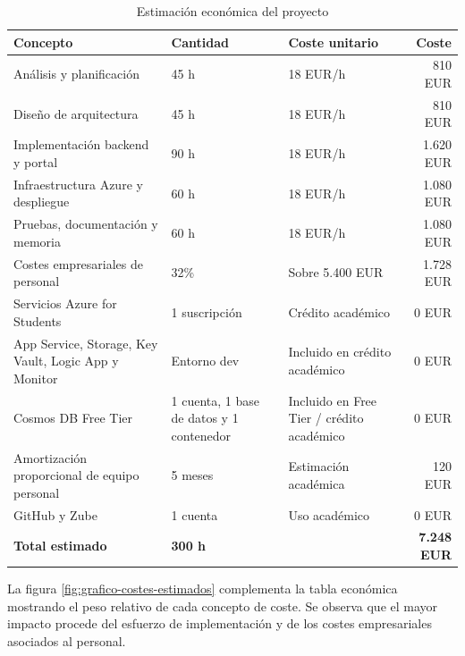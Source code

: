 \begin{table}[ht]
\centering
\scriptsize
\begin{tabular}{p{} p{} p{} r}
\textbf{Concepto} & \textbf{Cantidad} & \textbf{Coste unitario} & \textbf{Coste} \\
\hline
Análisis y planificación & 45 h & 18 EUR/h & 810 EUR \\
Diseño de arquitectura & 45 h & 18 EUR/h & 810 EUR \\
Implementación backend y portal & 90 h & 18 EUR/h & 1.620 EUR \\
Infraestructura Azure y despliegue & 60 h & 18 EUR/h & 1.080 EUR \\
Pruebas, documentación y memoria & 60 h & 18 EUR/h & 1.080 EUR \\
Costes empresariales de personal & 32\% & Sobre 5.400 EUR & 1.728 EUR \\
Servicios Azure for Students & 1 suscripción & Crédito académico & 0 EUR \\
App Service, Storage, Key Vault, Logic App y Monitor & Entorno dev & Incluido en crédito académico & 0 EUR \\
Cosmos DB Free Tier & 1 cuenta, 1 base de datos y 1 contenedor & Incluido en Free Tier / crédito académico & 0 EUR \\
Amortización proporcional de equipo personal & 5 meses & Estimación académica & 120 EUR \\
GitHub y Zube & 1 cuenta & Uso académico & 0 EUR \\
\hline
\textbf{Total estimado} & \textbf{300 h} & & \textbf{7.248 EUR} \\
\end{tabular}
\caption{Estimación económica del proyecto}
\end{table}


La figura \ref{fig:grafico-costes-estimados} complementa la tabla económica mostrando el peso relativo de cada concepto de coste. Se observa que el mayor impacto procede del esfuerzo de implementación y de los costes empresariales asociados al personal.

